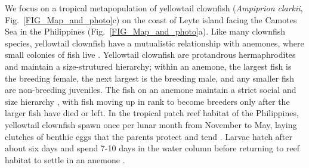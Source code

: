 \documentclass[12pt, oneside]{article}   	%
\begin{document}
We focus on a tropical metapopulation of yellowtail clownfish (\textit{Ampiprion clarkii}, Fig.\ \ref{FIG_Map_and_photo}c) on the coast of Leyte island facing the Camotes Sea in the Philippines (Fig.\ \ref{FIG_Map_and_photo}a). Like many clownfish species, yellowtail clownfish have a mutualistic relationship with anemones, where small colonies of fish live \citep{buston2003social, fautin1992field}. Yellowtail clownfish are protandrous hermaphrodites and maintain a size-strutured hierarchy; within an anemone, the largest fish is the breeding female, the next largest is the breeding male, and any smaller fish are non-breeding juveniles. The fish on an anemone maintain a strict social and size hierarchy \citep{buston2003social}, with fish moving up in rank to become breeders only after the larger fish have died or left. In the tropical patch reef habitat of the Philippines, yellowtail clownfish spawn once per lunar month from November to May, laying clutches of benthic eggs that the parents protect and tend \citep{ochi1989mating, holtswarth2017fecundity}. Larvae hatch after about six days and spend 7-10 days in the water column before returning to reef habitat to settle in an anemone \citep{fautin1992field}.

\end{document}
